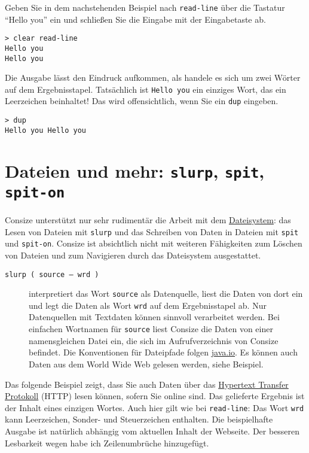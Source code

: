 Geben Sie in dem nachstehenden Beispiel nach \verb|read-line| über die Tastatur "`Hello you"' ein und schließen Sie die Eingabe mit der Eingabetaste ab.

\begin{verbatim}
> clear read-line
Hello you
Hello you
\end{verbatim}

Die Ausgabe lässt den Eindruck aufkommen, als handele es sich um zwei Wörter auf dem Ergebnisstapel. Tatsächlich ist \verb|Hello you| ein einziges Wort, das ein Leerzeichen beinhaltet! Das wird offensichtlich, wenn Sie ein \verb|dup| eingeben.

\begin{verbatim}
> dup
Hello you Hello you
\end{verbatim}

\section{Dateien und mehr: \texttt{slurp}, \texttt{spit}, \texttt{spit-on}}

Consize unterstützt nur sehr rudimentär die Arbeit mit dem \href{http://de.wikipedia.org/wiki/Dateisystem}{Dateisystem}: das Lesen von Dateien mit \verb|slurp| und das Schreiben von Daten in Dateien mit \verb|spit| und \verb|spit-on|. Consize ist absichtlich nicht mit weiteren Fähigkeiten zum Löschen von Dateien und zum Navigieren durch das Dateisystem ausgestattet.

\begin{description}
\item[\texttt{slurp ( source -- wrd )}] interpretiert das Wort \verb|source| als Datenquelle, liest die Daten von dort ein und legt die Daten als Wort \verb|wrd| auf dem Ergebnisstapel ab. Nur Datenquellen mit Textdaten können sinnvoll verarbeitet werden. Bei einfachen Wortnamen für \verb|source| liest Consize die Daten von einer namensgleichen Datei ein, die sich im Aufrufverzeichnis von Consize befindet. Die Konventionen für Dateipfade folgen \href{http://docs.oracle.com/javase/7/docs/api/java/io/File.html}{java.io}. Es können auch Daten aus dem World Wide Web gelesen werden, siehe Beispiel.
\end{description}

Das folgende Beispiel zeigt, dass Sie auch Daten über das \href{http://de.wikipedia.org/wiki/Http}{Hypertext Transfer Protokoll} (HTTP) lesen können, sofern Sie online sind. Das gelieferte Ergebnis ist der Inhalt eines einzigen Wortes. Auch hier gilt wie bei \verb|read-line|: Das Wort \verb|wrd| kann Leerzeichen, Sonder- und Steuerzeichen enthalten. Die beispielhafte Ausgabe ist natürlich abhängig vom aktuellen Inhalt der Webseite. Der besseren Lesbarkeit wegen habe ich Zeilenumbrüche hinzugefügt.

